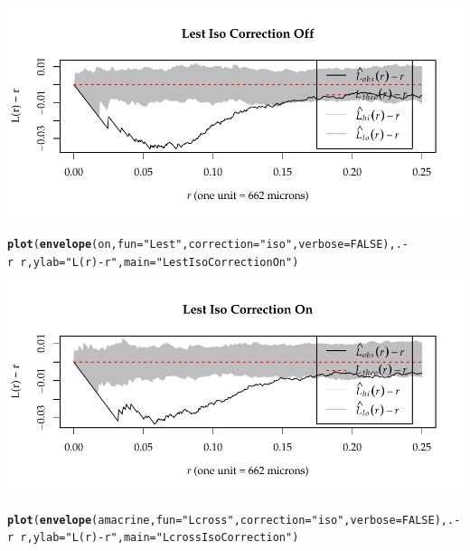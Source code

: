\documentclass{article}\usepackage[]{graphicx}\usepackage[]{color}
\makeatletter
\def\maxwidth{ %
  \ifdim\Gin@nat@width>\linewidth
    \linewidth
  \else
    \Gin@nat@width
  \fi
}
\newcommand{\hlnum}[1]{\textcolor[rgb]{0.686,0.059,0.569}{#1}}%
\newcommand{\hlstr}[1]{\textcolor[rgb]{0.192,0.494,0.8}{#1}}%
\newcommand{\hlopt}[1]{\textcolor[rgb]{0,0,0}{#1}}%
\newcommand{\hlstd}[1]{\textcolor[rgb]{0.345,0.345,0.345}{#1}}%
\newcommand{\hlkwc}[1]{\textcolor[rgb]{0.333,0.667,0.333}{#1}}%
\newcommand{\hlkwd}[1]{\textcolor[rgb]{0.737,0.353,0.396}{\textbf{#1}}}%
\newenvironment{kframe}{%
 \def\at@end@of@kframe{}%
 \ifinner\ifhmode%
  \def\at@end@of@kframe{\end{minipage}}%
  \begin{minipage}{\columnwidth}%
 \fi\fi%
 \def\FrameCommand##1{\hskip\@totalleftmargin \hskip-\fboxsep
 \colorbox{shadecolor}{##1}\hskip-\fboxsep
     \hskip-\linewidth \hskip-\@totalleftmargin \hskip\columnwidth}%
 \MakeFramed {\advance\hsize-\width
   \@totalleftmargin\z@ \linewidth\hsize
   \@setminipage}}%
 {\par\unskip\endMakeFramed%
 \at@end@of@kframe}
\newenvironment{knitrout}{}{} %
\makeatother
\begin{document}
\begin{enumerate}
\begin{knitrout}
{\centering \includegraphics[width=\maxwidth]{figure/prob3-5} 

}


\begin{kframe}\begin{alltt}
\hlkwd{plot}\hlstd{(}\hlkwd{envelope}\hlstd{(on,} \hlkwc{fun} \hlstd{=} \hlstr{"Lest"}\hlstd{,} \hlkwc{correction} \hlstd{=} \hlstr{"iso"}\hlstd{,} \hlkwc{verbose} \hlstd{=} \hlnum{FALSE}\hlstd{), .}\hlopt{-}\hlstd{r}\hlopt{~}\hlstd{r,} \hlkwc{ylab} \hlstd{=} \hlstr{"L(r) - r"}\hlstd{,} \hlkwc{main} \hlstd{=} \hlstr{"Lest Iso Correction On"}\hlstd{)}
\end{alltt}
\end{kframe}

{\centering \includegraphics[width=\maxwidth]{figure/prob3-6} 

}


\begin{kframe}\begin{alltt}
\hlkwd{plot}\hlstd{(}\hlkwd{envelope}\hlstd{(amacrine,} \hlkwc{fun} \hlstd{=} \hlstr{"Lcross"}\hlstd{,} \hlkwc{correction} \hlstd{=} \hlstr{"iso"}\hlstd{,} \hlkwc{verbose} \hlstd{=} \hlnum{FALSE}\hlstd{), .}\hlopt{-}\hlstd{r}\hlopt{~}\hlstd{r,} \hlkwc{ylab} \hlstd{=} \hlstr{"L(r) - r"}\hlstd{,} \hlkwc{main} \hlstd{=} \hlstr{"Lcross Iso Correction"}\hlstd{)}
\end{alltt}
\end{kframe}


\end{knitrout}
\end{enumerate}
\end{document}
